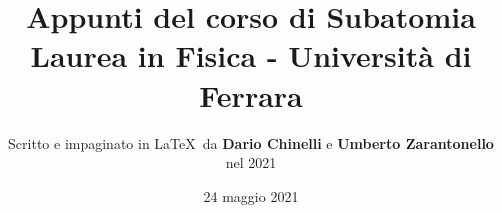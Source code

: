 \documentclass[11pt]{article}
\begin{document}
\title{\textbf{Appunti del corso di Subatomia} \\
Laurea in Fisica - Università di Ferrara} 

\author{Scritto e impaginato in \LaTeX\ da \textbf{Dario Chinelli} e \textbf{Umberto Zarantonello} nel 2021}

\date{24 maggio 2021}

\maketitle

\newpage

\tableofcontents

\newpage






















%

%



% 
\end{document}
